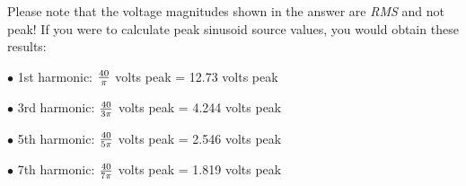Please note that the voltage magnitudes shown in the answer are {\it RMS} and not peak!  If you were to calculate peak sinusoid source values, you would obtain these results:

\medskip
\goodbreak
\item{$\bullet$} 1st harmonic: ${40 \over \pi}$ volts peak = 12.73 volts peak
\vskip 5pt
\item{$\bullet$} 3rd harmonic: ${40 \over {3 \pi}}$ volts peak = 4.244 volts peak
\vskip 5pt
\item{$\bullet$} 5th harmonic: ${40 \over {5 \pi}}$ volts peak = 2.546 volts peak
\vskip 5pt
\item{$\bullet$} 7th harmonic: ${40 \over {7 \pi}}$ volts peak = 1.819 volts peak
\medskip




